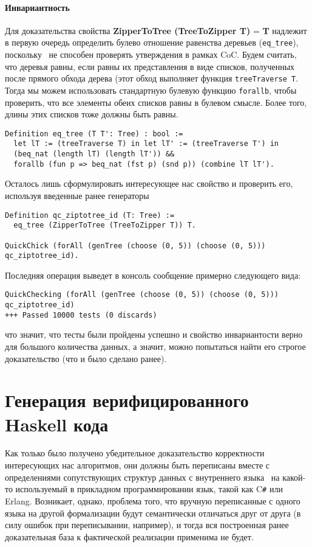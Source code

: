 \paragraph{Инвариантность} Для доказательства свойства \textbf{ZipperToTree (TreeToZipper T)} = \textbf{T} надлежит в первую очередь определить булево отношение равенства деревьев (\texttt{eq\_tree}), поскольку \tqc~не способен проверять утверждения в рамках CoC. Будем считать, что деревья равны, если равны их представления в виде списков, полученных после прямого обхода дерева (этот обход выполняет функция \texttt{treeTraverse T}. Тогда мы можем использовать стандартную булевую функцию \texttt{forallb}, чтобы проверить, что все элементы обеих списков равны в булевом смысле. Более того, длины этих списков тоже должны быть равны.
\begin{lstlisting}
Definition eq_tree (T T': Tree) : bool :=
  let lT := (treeTraverse T) in let lT' := (treeTraverse T') in
  (beq_nat (length lT) (length lT')) &&
  forallb (fun p => beq_nat (fst p) (snd p)) (combine lT lT').
\end{lstlisting}

Осталось лишь сформулировать интересующее нас свойство и проверить его, используя введенные ранее генераторы
\begin{lstlisting}
Definition qc_ziptotree_id (T: Tree) :=
  eq_tree (ZipperToTree (TreeToZipper T)) T.
  
QuickChick (forAll (genTree (choose (0, 5)) (choose (0, 5))) qc_ziptotree_id).
\end{lstlisting}

Последняя операция выведет в консоль сообщение примерно следующего вида:
\begin{Verbatim}[fontsize=\scriptsize]
QuickChecking (forAll (genTree (choose (0, 5)) (choose (0, 5))) qc_ziptotree_id)
+++ Passed 10000 tests (0 discards)
\end{Verbatim}
что значит, что тесты были пройдены успешно и свойство инвариантости верно для большого количества данных, а значит, можно попытаться найти его строгое доказательство (что и было сделано ранее).

\section{Генерация верифицированного Haskell кода}
Как только было получено убедительное доказательство корректности интересующих нас алгоритмов, они должны быть переписаны вместе с определениями сопутствующих структур данных с внутреннего языка \tcoq~на какой-то используемый в прикладном программировании язык, такой как C\texttt{\#} или Erlang. Возникает, однако, проблема того, что вручную переписанные с одного языка на другой формализации будут семантически отличаться друг от друга (в силу ошибок при переписывании, например), и тогда вся построенная ранее доказательная база к фактической реализации применима не будет. 

